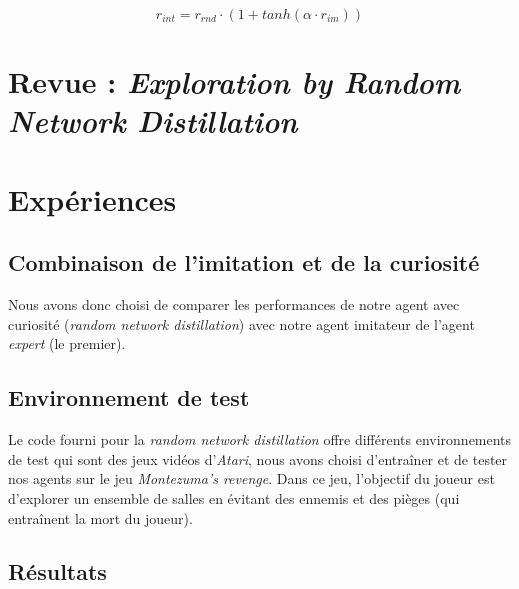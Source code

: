 \documentclass[a4paper,12pt]{report}
\begin{document}
\begin{equation} r_{int} = r_{rnd} \cdot (1 + tanh(\alpha \cdot r_{im})) \end{equation}

\newpage \section{Revue : \textit{Exploration by Random Network Distillation}}
\label{revue_distillation}

\newpage \section{Expériences}
\subsection{Combinaison de l'imitation et de la curiosité}
Nous avons donc choisi de comparer les performances de notre agent avec curiosité (\textit{random network distillation}) avec notre agent imitateur de l'agent \textit{expert} (le premier).

\subsection{Environnement de test}
Le code fourni pour la \textit{random network distillation} offre différents environnements de test qui sont des jeux vidéos d'\textit{Atari}, nous avons choisi d'entraîner et de tester nos agents sur le jeu \textit{Montezuma's revenge}\cite{montezuma}. Dans ce jeu, l'objectif du joueur est d'explorer un ensemble de salles en évitant des ennemis et des pièges (qui entraînent la mort du joueur).

\subsection{Résultats}
\end{document}
